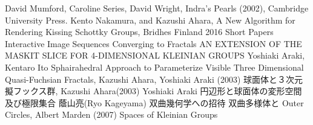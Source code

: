 {
\setlength{\baselineskip}{13pt}
\begin{thebibliography}{99}

         David Mumford, Caroline Series, David Wright, Indra's Pearls
         (2002), Cambridge University Press.
         Kento Nakamura, and Kazushi Ahara, A New Algorithm for
         Rendering Kissing Schottky Groups,
         Bridhes Finland 2016 Short Papers
        Interactive Image Sequences Converging to Fractals
        AN EXTENSION OF THE MASKIT SLICE FOR 4-DIMENSIONAL KLEINIAN GROUPS
        Yoshiaki Araki, Kentaro Ito
        Sphairahedral Approach to Parameterize Visible Three Dimensional Quasi-Fuchsian Fractals,
        Kazushi Ahara, Yoshiaki Araki (2003)
        球面体と３次元擬フックス群,
        Kazushi Ahara(2003)
        Yoshiaki Araki
        円辺形と球面体の変形空間及び極限集合
        蔭山亮(Ryo Kageyama)
        双曲幾何学への招待
        双曲多様体と
        Outer Circles, Albert Marden (2007)
        Spaces of Kleinian Groups
\end{thebibliography}
}